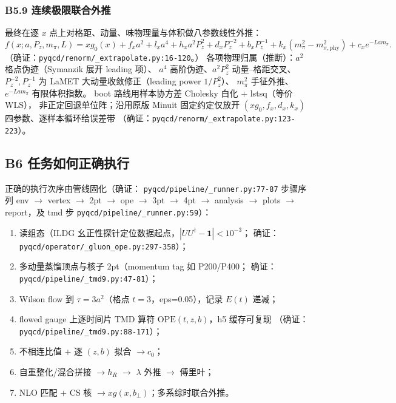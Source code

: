 \documentclass[UTF8]{ctexart}
\begin{document}
\subsubsection{B5.9 连续极限联合外推}
最终在逐 $x$ 点上对格距、动量、味物理量与体积做八参数线性外推：
\begin{equation}
f(x;a,P_z,m_\pi,L)=xg_0(x)+f_x a^2+l_x a^4+h_x a^2P_z^2
+d_x P_z^{-2}+b_x P_z^{-1}+k_x(m_\pi^2-m_{\pi,\mathrm{phy}}^2)
+c_x e^{-La m_\pi}.
\label{eq:extrap}
\end{equation}
（确证：\texttt{\nolinkurl{pyqcd/renorm/_extrapolate.py:16-120}}。）
各项物理归属（推断）：$a^2$ 格点伪迹（Symanzik 展开 leading 项）、
$a^4$ 高阶伪迹、$a^2P_z^2$ 动量--格距交叉、$P_z^{-2},P_z^{-1}$
为 LaMET 大动量收敛修正（leading power $1/P_z^2$）、
$m_\pi^2$ 手征外推、$e^{-La m_\pi}$ 有限体积指数。
boot 路线用样本协方差 Cholesky 白化 + lstsq（等价 WLS），
非正定回退单位阵；沿用原版 Minuit 固定约定仅放开
$(xg_0,f_x,d_x,k_x)$ 四参数、逐样本循环给误差带
（确证：\texttt{\nolinkurl{pyqcd/renorm/_extrapolate.py:123-223}}）。

\subsection{B6 任务如何正确执行}
正确的执行次序由管线固化（确证：
\texttt{\nolinkurl{pyqcd/pipeline/_runner.py:77-87}} 步骤序列
env $\to$ vertex $\to$ 2pt $\to$ ope $\to$ 3pt $\to$ 4pt $\to$ analysis $\to$
plots $\to$ report，及 tmd 步 \texttt{\nolinkurl{pyqcd/pipeline/_runner.py:59}}）：
\begin{enumerate}
\item 读组态（ILDG 幺正性探针定位数据起点，$|UU^\dagger-\mathbf{1}|<10^{-3}$；
确证：\texttt{\nolinkurl{pyqcd/operator/_gluon_ope.py:297-358}}）；
\item 多动量蒸馏顶点与核子 2pt（momentum tag 如 P200/P400；
确证：\texttt{\nolinkurl{pyqcd/pipeline/_tmd9.py:47-81}}）；
\item Wilson flow 到 $\tau=3a^2$（格点 $t=3$，eps=0.05），记录 $E(t)$ 递减；
\item flowed gauge 上逐时间片 TMD 算符 $\mathrm{OPE}(t,z,b)$，h5 缓存可复现
（确证：\texttt{\nolinkurl{pyqcd/pipeline/_tmd9.py:88-171}}）；
\item 不相连比值 + 逐 $(z,b)$ 拟合 $\to c_0$；
\item 自重整化/混合拼接 $\to h_R$ $\to$ $\lambda$ 外推 $\to$ 傅里叶；
\item NLO 匹配 + CS 核 $\to xg(x,b_\perp)$；多系综时联合外推。
\end{enumerate}
\end{document}
